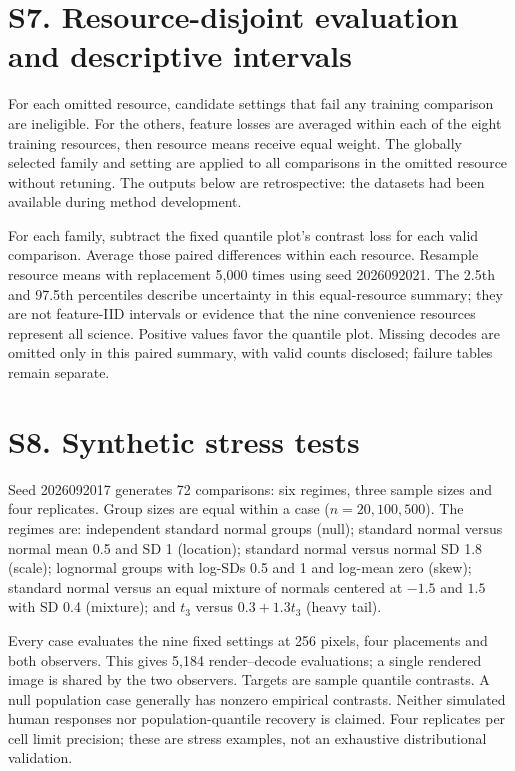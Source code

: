 \documentclass[10pt]{article}
\begin{document}
\section*{S7. Resource-disjoint evaluation and descriptive intervals}
For each omitted resource, candidate settings that fail any training comparison are ineligible. For the others, feature losses are averaged within each of the eight training resources, then resource means receive equal weight. The globally selected family and setting are applied to all comparisons in the omitted resource without retuning. The outputs below are retrospective: the datasets had been available during method development.

\begin{center}\small\end{center}

For each family, subtract the fixed quantile plot's contrast loss for each valid comparison. Average those paired differences within each resource. Resample resource means with replacement 5,000 times using seed 2026092021. The 2.5th and 97.5th percentiles describe uncertainty in this equal-resource summary; they are not feature-IID intervals or evidence that the nine convenience resources represent all science. Positive values favor the quantile plot. Missing decodes are omitted only in this paired summary, with valid counts disclosed; failure tables remain separate.

\begin{center}\small\end{center}

\section*{S8. Synthetic stress tests}
Seed 2026092017 generates 72 comparisons: six regimes, three sample sizes and four replicates. Group sizes are equal within a case ($n=20,100,500$). The regimes are: independent standard normal groups (null); standard normal versus normal mean 0.5 and SD 1 (location); standard normal versus normal SD 1.8 (scale); lognormal groups with log-SDs 0.5 and 1 and log-mean zero (skew); standard normal versus an equal mixture of normals centered at $-1.5$ and $1.5$ with SD 0.4 (mixture); and $t_3$ versus $0.3+1.3t_3$ (heavy tail).

Every case evaluates the nine fixed settings at 256 pixels, four placements and both observers. This gives 5,184 render--decode evaluations; a single rendered image is shared by the two observers. Targets are sample quantile contrasts. A null population case generally has nonzero empirical contrasts. Neither simulated human responses nor population-quantile recovery is claimed. Four replicates per cell limit precision; these are stress examples, not an exhaustive distributional validation.
\end{document}
